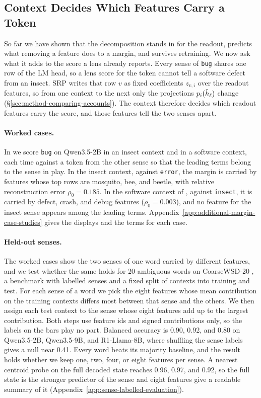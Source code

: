 \subsection{Context Decides Which Features Carry a Token}\label{subsec:same-token-analysis}\label{subsec:label-audit}\label{subsec:context-reweighting}
So far we have shown that the decomposition stands in for the readout,
predicts what removing a feature does to a margin, and survives
retraining. We now ask what it adds to the score a lens already
reports. Every sense of \texttt{bug} shares one row of the LM head, so
a lens score for the token cannot tell a software defect from an
insect. SRP writes that row \(v\) as fixed coefficients \(z_{v,i}\)
over the readout features, so from one context to the next only the
projections \(p_i(\tilde h_\ell)\) change (\S\ref{sec:method-comparing-accounts}).
The context therefore decides which readout features carry the score,
and those features tell the two senses apart.

\paragraph{Worked cases.}
In  we score \texttt{bug} on
Qwen3.5-2B in an insect context and in a software context, each time
against a token from the other sense so that the leading terms belong
to the sense in play. In the insect context, against \texttt{error},
the margin is carried by features whose top rows are mosquito, bee,
and beetle, with relative reconstruction error \(\rho_0=0.185\). In
the software context of , against
\texttt{insect}, it is carried by defect, crash, and debug features
(\(\rho_0=0.003\)), and no feature for the insect sense appears among
the leading terms. Appendix~\ref{app:additional-margin-case-studies}
gives the displays and the terms for each case.

\paragraph{Held-out senses.}
The worked cases show the two senses of one word carried by different
features, and we test whether the same holds for 20 ambiguous words on
CoarseWSD-20 \citep{loureiro2021coarsewsd}, a benchmark with labelled
senses and a fixed split of contexts into training and test. For each
sense of a word we pick the eight features whose mean contribution on
the training contexts differs most between that sense and the others.
We then assign each test context to the sense whose eight features add
up to the largest contribution. Both steps use feature ids and signed
contributions only, so the labels on the bars play no part. Balanced
accuracy is 0.90, 0.92, and 0.80 on Qwen3.5-2B, Qwen3.5-9B, and
R1-Llama-8B, where shuffling the sense labels gives a null near 0.41.
Every word beats its majority baseline, and the result holds whether
we keep one, two, four, or eight features per sense. A nearest
centroid probe on the full decoded state reaches 0.96, 0.97, and 0.92,
so the full state is the stronger predictor of the sense and eight
features give a readable summary of it
(Appendix~\ref{app:sense-labelled-evaluation}).

